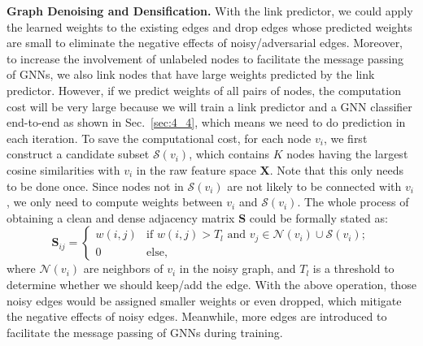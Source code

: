 \noindent\textbf{Graph Denoising and Densification.} 
With the link predictor, we could apply the learned weights to the existing edges and drop edges whose predicted weights are small to eliminate the negative effects of noisy/adversarial edges. Moreover, to increase the involvement of unlabeled nodes to facilitate the message passing of GNNs, we also link nodes that have large weights predicted by the link predictor. However, if we predict weights of all pairs of nodes, the computation cost will be very large because we will train a link predictor and a GNN classifier end-to-end as shown in Sec.~\ref{sec:4_4}, which means we need to do prediction in each iteration. To save the computational cost, for each node $v_i$, we first construct a candidate subset $\mathcal{S}(v_i)$, which contains $K$ nodes having the largest cosine similarities with $v_i$ in the raw feature space $\mathbf{X}$. Note that this only needs to be done once. Since nodes not in $\mathcal{S}(v_i)$ are not likely to be connected with $v_i$, we only need to compute weights between $v_i$ and $\mathcal{S}(v_i)$. The whole process of obtaining a clean and dense adjacency matrix $\mathbf{S}$ could be formally stated as:
\begin{equation}
    \mathbf{S}_{ij} = \left\{ \begin{array}{ll}
         w(i,j) & \mbox{if $w(i,j) > T_l$ and $v_j \in \mathcal{N}(v_i) \cup \mathcal{S}(v_i)$} ;\\
        0 & \mbox{else},\end{array} \right.
        \label{eq:generate_graph}
\end{equation}
where $\mathcal{N}(v_i)$ are neighbors of $v_i$ in the noisy graph, and $T_l$ is a threshold to determine whether we should keep/add the edge.  With the above operation, those noisy edges would be assigned smaller weights or even dropped, which mitigate the negative effects of noisy edges. Meanwhile, more edges are introduced to facilitate the message passing of GNNs during training.

